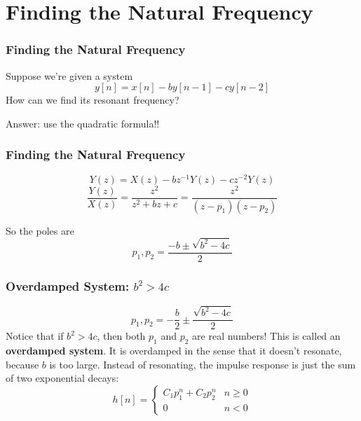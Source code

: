 \documentclass{beamer}
\begin{document}
\section[Solving]{Finding the Natural Frequency}
\setcounter{subsection}{1}

\begin{frame}
  \frametitle{Finding the Natural Frequency}

  Suppose we're given a system
  \begin{displaymath}
    y[n] = x[n] -b y[n-1]-cy[n-2]
  \end{displaymath}
  How can we find its resonant frequency?

  Answer: use the quadratic formula!!
\end{frame}

\begin{frame}
  \frametitle{Finding the Natural Frequency}
  
  \begin{displaymath}
    Y(z) = X(z) -bz^{-1}Y(z)-cz^{-2}Y(z)
  \end{displaymath}
  \begin{displaymath}
    \frac{Y(z)}{X(z)} = \frac{z^2}{z^2+bz+c} = \frac{z^2}{(z-p_1)(z-p_2)}
  \end{displaymath}

  So the poles are
  \begin{displaymath}
    p_1,p_2 = \frac{-b\pm \sqrt{b^2-4c}}{2}
  \end{displaymath}
\end{frame}

\begin{frame}
  \frametitle{Overdamped System: $b^2>4c$}
  
  \begin{displaymath}
    p_1,p_2 = -\frac{b}{2}\pm \frac{\sqrt{b^2-4c}}{2}
  \end{displaymath}
  Notice that if $b^2>4c$, then both $p_1$ and $p_2$ are real numbers!
  This is called an {\bf overdamped system}.  It is overdamped in the
  sense that it doesn't resonate, because $b$ is too large.  Instead
  of resonating, the impulse response is just the sum of two exponential decays:
  \begin{displaymath}
    h[n] = \left\{\begin{array}{ll}
    C_1 p_1^n+C_2p_2^n  & n \ge 0\\
    0 & n < 0
    \end{array}\right.
  \end{displaymath}
    
\end{frame}
\end{document}
